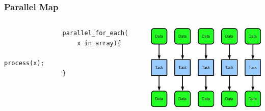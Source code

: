 \documentclass[xcolor=dvipsnames]{beamer}
\begin{document}
		
	\begin{frame}[fragile] \frametitle{Parallel Map}
		\begin{columns}
			\begin{column}{0.5\textwidth}
				\begin{verbatim}
				parallel_for_each(
				    x in array){
					        process(x);
				}
				\end{verbatim}
		    \end{column}
	  		\begin{column}{0.5\textwidth}
				\includegraphics[width=60mm]{images/map_parallel.png}
			\end{column}
		\end{columns}
	\end{frame}
		
\end{document}
